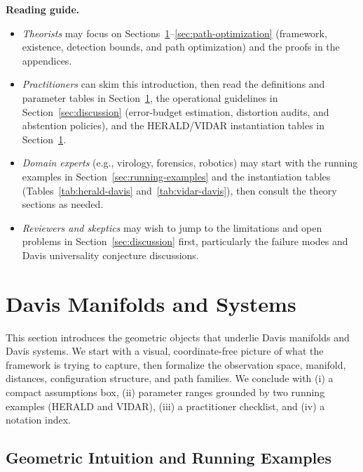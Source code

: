 \documentclass[11pt]{article}
\begin{document}
\begin{mdframed}[linewidth=0.5pt,backgroundcolor=black!1]
\noindent\textbf{Reading guide.}
\begin{itemize}[leftmargin=*]
    \item \emph{Theorists} may focus on Sections~\ref{sec:davis-defs}--\ref{sec:path-optimization} (framework, existence, detection bounds, and path optimization) and the proofs in the appendices.
    
    \item \emph{Practitioners} can skim this introduction, then read the definitions and parameter tables in Section~\ref{sec:davis-defs}, the operational guidelines in Section~\ref{sec:discussion} (error-budget estimation, distortion audits, and abstention policies), and the HERALD/VIDAR instantiation tables in Section~\ref{sec:davis-defs}.
    
    \item \emph{Domain experts} (e.g., virology, forensics, robotics) may start with the running examples in Section~\ref{sec:running-examples} and the instantiation tables (Tables~\ref{tab:herald-davis} and~\ref{tab:vidar-davis}), then consult the theory sections as needed.
    
    \item \emph{Reviewers and skeptics} may wish to jump to the limitations and open problems in Section~\ref{sec:discussion} first, particularly the failure modes and Davis universality conjecture discussions.
\end{itemize}
\end{mdframed}


\section{Davis Manifolds and Systems}
\label{sec:davis-defs}
\label{sec:davis-systems}

This section introduces the geometric objects that underlie Davis manifolds and Davis systems.
We start with a visual, coordinate-free picture of what the framework is trying to capture, then
formalize the observation space, manifold, distances, configuration structure, and path families.
We conclude with (i) a compact assumptions box, (ii) parameter ranges grounded by two running
examples (HERALD and VIDAR), (iii) a practitioner checklist, and (iv) a notation index.

\subsection{Geometric Intuition and Running Examples}
\label{subsec:intuition}
\end{document}

